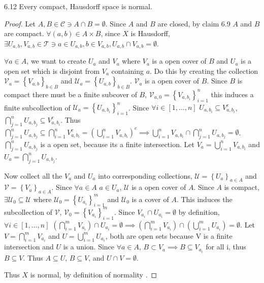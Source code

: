 \documentclass{article}
\newcommand*{\T}{\mathcal{T}}
\newcommand*{\subeq}{\subseteq}
\newcommand*{\empset}{\emptyset}
\begin{document}
\begin{claim}{6.12}\label{Claim 6.12.}
    Every compact, Hausdorff space is normal.
\end{claim}
\begin{proof}
    Let $A, B \in \mathcal{C} \ni A \cap B = \empset$. Since $A$ and $B$ are closed, by claim 6.9 $A$ and $B$ are compact. $\forall (a, b) \in A \times B$, since $X$ is Hausdorff, $\exists U_{a, b}, V_{a, b} \in \T \ni a \in U_{a, b}, b \in V_{a, b}, U_{a, b} \cap V_{a, b} = \empset$. 
    
    $\forall a \in A$, we want to create $U_{a}$ and $V_{a}$ where $V_{a}$ is a open cover of $B$ and $U_{a}$ is a open set which is disjoint from $V_a$ containing $a$. Do this by creating the collection $\mathcal{V}_{a} = \left\{ V_{a, b} \right\}_{b \in B}$ and $\mathcal{U}_{a} = \left\{ U_{a, b} \right\}_{b \in B}$. $\mathcal{V}_a$ is a open cover of $B$. Since $B$ is compact there must be a finite subcover of $B$, $\mathcal{V}_{a, 0} = \left\{ V_{a, b_i} \right\}_{i = 1}^n$ this induces a finite subcollection of $\mathcal{U}_a = \left\{ U_{a, b_i} \right\}_{i = 1}^n$. Since $\forall i \in [1, \dots, n]$ $U_{a, b_i} \subeq V_{a, b_i}^c $, $\bigcap_{j = 1}^n U_{a, b_j} \subseteq V_{a, b_i}^c$. Thus $\bigcap_{j = 1}^n U_{a, b_j} \subseteq \bigcap_{i = 1}^n V_{a, b_i}^c = \left(\bigcup_{i = 1}^n V_{a, b_i}\right)^c \implies \bigcup_{i = 1}^n V_{a, b_i} \cap\bigcap_{j = 1}^n U_{a, b_j} = \empset$. $\bigcap_{j = 1}^n U_{a, b_j}$ is a open set, because its a finite intersection. Let $V_{a} = \bigcup_{i = 1}^n V_{a, b_i}$ and $U_a = \bigcap_{j = 1}^n U_{a, b_j}$.
    
    Now collect all the $V_a$ and $U_a$ into corresponding collections, $\mathcal{U} = \left\{ U_a \right\}_{a \in A}$ and $\mathcal{V} = \left\{ V_a \right\}_{a \in A}$. Since $\forall a \in A$ $a \in U_a$, $\mathcal{U}$ is a open cover of $A$. Since $A$ is compact, $\exists \mathcal{U}_0 \subseteq \mathcal{U}$ where $\mathcal{U}_0 = \left\{ U_{a_i} \right\}_{i = 1}^m$ and $\mathcal{U}_0$ is a cover of $A$. This induces the subcollection of $\mathcal{V}$, $\mathcal{V}_0 = \left\{ V_{a_i} \right\}_{i = 1}^m$. Since $V_{a_i} \cap U_{a_i} = \empset$ by definition, $\forall i \in [1, \dots, n]$ $\left(\bigcap_{i = 1}^m V_{a_i}\right) \cap U_{a_i} = \empset \implies \left(\bigcap_{i = 1}^m V_{a_i}\right) \cap \left(\bigcup_{i = 1}^m U_{a_i}\right) = \empset$. Let $V = \bigcap_{i = 1}^m V_{a_i}$ and $U = \bigcup_{i = 1}^m U_{a_i}$, both are open sets because V is a finite intersection and $U$ is a union. Since $\forall a \in A$, $B \subset V_{a} \implies B \subseteq V_{a_i}$ for all i, thus $B \subseteq V$. Thus $A \subeq U$, $B \subeq V$, and $U \cap V = \empset$. 
    
    Thus $X$ is normal, by definition of normality .  
\end{proof}
\end{document}
